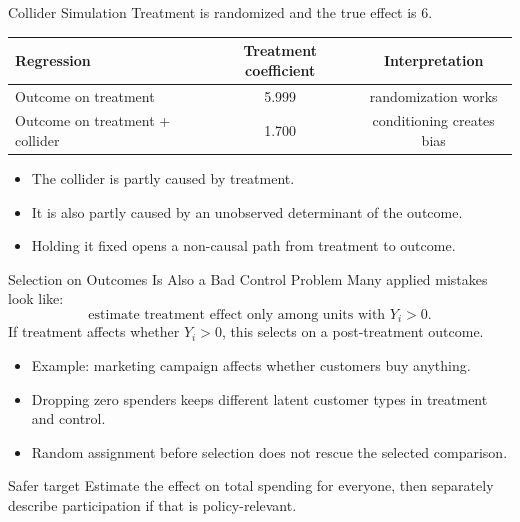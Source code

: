 \documentclass[11pt,aspectratio=169]{beamer}
\begin{document}
\begin{frame}{Collider Simulation}
  Treatment is randomized and the true effect is 6.
  \vspace{0.3em}

  \begin{center}
    \begin{tabular}{@{}lcc@{}}
      \toprule
      Regression & Treatment coefficient & Interpretation \\
      \midrule
      Outcome on treatment & 5.999 & randomization works \\
      Outcome on treatment + collider & 1.700 & conditioning creates bias \\
      \bottomrule
    \end{tabular}
  \end{center}
  \vspace{0.3em}
  \begin{itemize}
    \item The collider is partly caused by treatment.
    \item It is also partly caused by an unobserved determinant of the outcome.
    \item Holding it fixed opens a non-causal path from treatment to outcome.
  \end{itemize}
\end{frame}

\begin{frame}{Selection on Outcomes Is Also a Bad Control Problem}
  Many applied mistakes look like:
  \[
    \text{estimate treatment effect only among units with }Y_i>0.
  \]
  \vspace{0.3em}
  If treatment affects whether \(Y_i>0\), this selects on a post-treatment outcome.
  \begin{itemize}
    \item Example: marketing campaign affects whether customers buy anything.
    \item Dropping zero spenders keeps different latent customer types in treatment and control.
    \item Random assignment before selection does not rescue the selected comparison.
  \end{itemize}
  \begin{block}{Safer target}
    Estimate the effect on total spending for everyone, then separately describe participation if that is policy-relevant.
  \end{block}
\end{frame}
\end{document}

